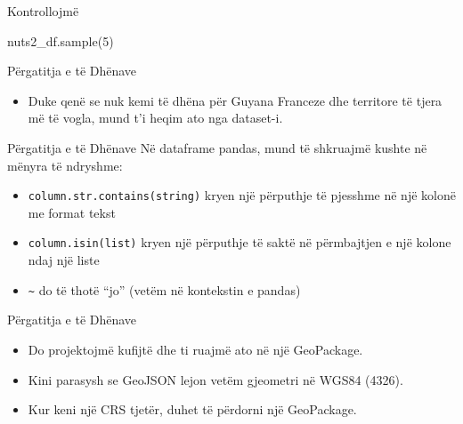 \documentclass[
  ignorenonframetext,
]{beamer}
\newenvironment{Shaded}{\begin{snugshade}}{\end{snugshade}}
\newcommand{\DecValTok}[1]{\textcolor[rgb]{0.00,0.00,0.81}{#1}}
\newcommand{\NormalTok}[1]{#1}
\providecommand{\tightlist}{%
  \setlength{\itemsep}{0pt}\setlength{\parskip}{0pt}}
\begin{document}
\begin{frame}[fragile]{Kontrollojmë}
\protect\hypertarget{kontrollojmuxeb}{}

\begin{Shaded}
\begin{Highlighting}[]
\NormalTok{nuts2\_df.sample(}\DecValTok{5}\NormalTok{)}
\end{Highlighting}
\end{Shaded}
\end{frame}

\begin{frame}{Përgatitja e të Dhënave}
\protect\hypertarget{puxebrgatitja-e-tuxeb-dhuxebnave}{}
\begin{itemize}
\tightlist
\item
  Duke qenë se nuk kemi të dhëna për Guyana Franceze dhe territore të
  tjera më të vogla, mund t'i heqim ato nga dataset-i.
\end{itemize}
\end{frame}

\begin{frame}[fragile]{Përgatitja e të Dhënave}
\protect\hypertarget{puxebrgatitja-e-tuxeb-dhuxebnave-1}{}
Në dataframe pandas, mund të shkruajmë kushte në mënyra të ndryshme:

\begin{itemize}
\item
  \texttt{column.str.contains(string)} kryen një përputhje të pjesshme
  në një kolonë me format tekst
\item
  \texttt{column.isin(list)} kryen një përputhje të saktë në përmbajtjen
  e një kolone ndaj një liste
\item
  \texttt{\textasciitilde{}} do të thotë ``jo'' (vetëm në kontekstin e
  pandas)
\end{itemize}
\end{frame}

\begin{frame}{Përgatitja e të Dhënave}
\protect\hypertarget{puxebrgatitja-e-tuxeb-dhuxebnave-2}{}
\begin{itemize}
\item
  Do projektojmë kufijtë dhe ti ruajmë ato në një GeoPackage.
\item
  Kini parasysh se GeoJSON lejon vetëm gjeometri në WGS84 (4326).
\item
  Kur keni një CRS tjetër, duhet të përdorni një GeoPackage.
\end{itemize}
\end{frame}
\end{document}
